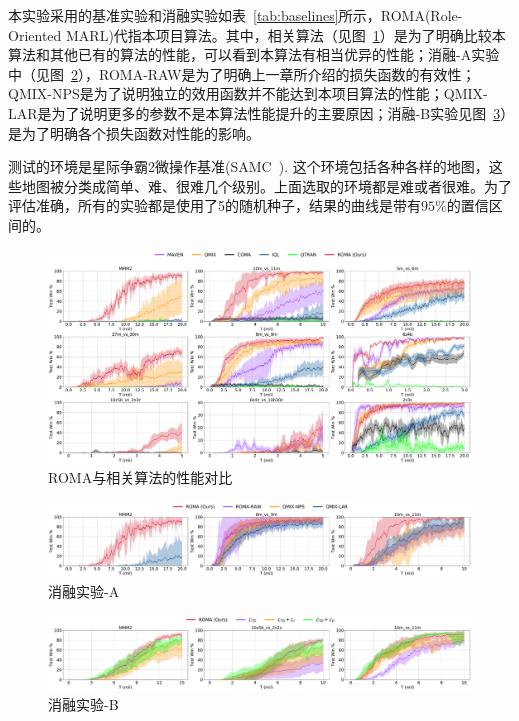   本实验采用的基准实验和消融实验如表~\ref{tab:baselines}所示，ROMA(Role-Oriented MARL)代指本项目算法。其中，相关算法（见图~\ref{fig:performance-baselines}）是为了明确比较本算法和其他已有的算法的性能，可以看到本算法有相当优异的性能；消融-A实验中（见图~\ref{fig:performance-ablations-A}），ROMA-RAW是为了明确上一章所介绍的损失函数的有效性；QMIX-NPS是为了说明独立的效用函数并不能达到本项目算法的性能；QMIX-LAR是为了说明更多的参数不是本算法性能提升的主要原因；消融-B实验见图~\ref{fig:performance-ablations-B}）是为了明确各个损失函数对性能的影响。

  测试的环境是星际争霸2微操作基准(SAMC~\cite{samvelyan2019starcraft}). 这个环境包括各种各样的地图，这些地图被分类成简单、难、很难几个级别。上面选取的环境都是难或者很难。为了评估准确，所有的实验都是使用了5的随机种子，结果的曲线是带有$95\%$的置信区间的。

\begin{figure}
    \includegraphics[width=\linewidth]{figures/learning-curve/learning_curve.pdf}
    \caption{ROMA与相关算法的性能对比}\label{fig:performance-baselines}
\end{figure}

\begin{figure}
    \includegraphics[width=\linewidth]{figures/learning-curve/ablation-A.pdf}
    \caption{消融实验-A}\label{fig:performance-ablations-A}
\end{figure}

\begin{figure}
    \includegraphics[width=\linewidth]{figures/learning-curve/ablation-B.pdf}
    \caption{消融实验-B}\label{fig:performance-ablations-B}
\end{figure}
  
